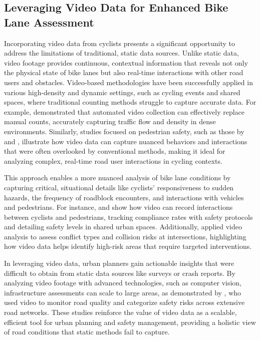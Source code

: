 \subsection{Leveraging Video Data for Enhanced Bike Lane Assessment}

Incorporating video data from cyclists presents a significant opportunity to address the limitations of traditional, static data sources. Unlike static data, video footage provides continuous, contextual information that reveals not only the physical state of bike lanes but also real-time interactions with other road users and obstacles. Video-based methodologies have been successfully applied in various high-density and dynamic settings, such as cycling events and shared spaces, where traditional counting methods struggle to capture accurate data. For example, \citet{Zaki:2016} demonstrated that automated video collection can effectively replace manual counts, accurately capturing traffic flow and density in dense environments. Similarly, studies focused on pedestrian safety, such as those by \citet{Xu:2018} and \citet{Madigan:2021}, illustrate how video data can capture nuanced behaviors and interactions that were often overlooked by conventional methods, making it ideal for analyzing complex, real-time road user interactions in cycling contexts.

This approach enables a more nuanced analysis of bike lane conditions by capturing critical, situational details like cyclists' responsiveness to sudden hazards, the frequency of roadblock encounters, and interactions with vehicles and pedestrians. For instance, \citet{Li:2021} and \citet{Essa:2018} show how video can record interactions between cyclists and pedestrians, tracking compliance rates with safety protocols and detailing safety levels in shared urban spaces. Additionally, \citet{Kronprasert:2021} applied video analysis to assess conflict types and collision risks at intersections, highlighting how video data helps identify high-risk areas that require targeted interventions.

In leveraging video data, urban planners gain actionable insights that were difficult to obtain from static data sources like surveys or crash reports. By analyzing video footage with advanced technologies, such as computer vision, infrastructure assessments can scale to large areas, as demonstrated by \citet{Tripodi:2020}, who used video to monitor road quality and categorize safety risks across extensive road networks. These studies reinforce the value of video data as a scalable, efficient tool for urban planning and safety management, providing a holistic view of road conditions that static methods fail to capture.


